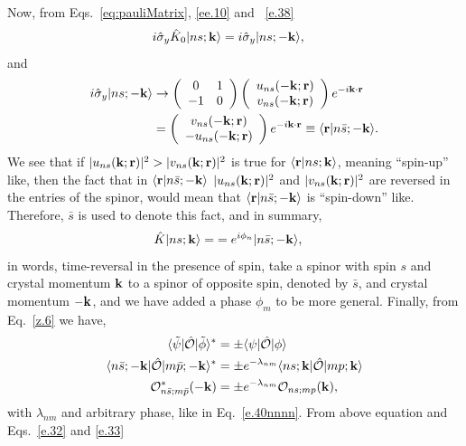 \documentclass[floatfix,prb,aps,superscriptaddress,11pt]{revtex4}
\begin{document}
Now, from 
Eqs.~\eqref{eq:pauliMatrix}, \eqref{ee.10} 
and ~\eqref{e.38}
\begin{align}\label{e.40}
i\hat{\sigma}_y\hat K_0
| ns;\mathbf{k} \rangle
&=
i\hat{\sigma}_y| ns;-\mathbf{k} \rangle
,
\end{align}  
and
\begin{eqnarray}\label{e.38nnn}
i\hat{\sigma}_y| ns;-\mathbf{k} \rangle
&\to  
\left(\begin{array}{cc}   
0  & 1 \\   
-1 & 0  
\end{array}\right)  
\left(\begin{array}{c}   
u_{n s}(-\mathbf{k};\mathbf{r})  \\   
v_{n s}(-\mathbf{k};\mathbf{r})  
\end{array}\right)    
e^{-i\mathbf{k}\cdot\mathbf{r}}
\nonumber\\
&=
\left(\begin{array}{c} 
v_{ns}(-\mathbf{k};\mathbf{r})  \\ 
-u_{ns}(-\mathbf{k};\mathbf{r})  
\end{array}\right)   
e^{-i\mathbf{k}\cdot\mathbf{r}}
\equiv \langle {\mathbf{r}} | {n\bar s;-\mathbf{k}} \rangle
.  
\end{eqnarray}  
We see that if 
$|u_{ns}(\mathbf{k};\mathbf{r})|^2>|v_{ns}(\mathbf{k};\mathbf{r})|^2$  
is true for 
$\langle {\mathbf{r}} | {ns;\mathbf{k}} \rangle$, 
meaning ``spin-up'' like, 
then the fact that in
$\langle {\mathbf{r}} | {n\bar s;-\mathbf{k}} \rangle$ 
$|u_{ns}(\mathbf{k};\mathbf{r})|^2$ and $|v_{ns}(\mathbf{k};\mathbf{r})|^2$ are reversed in
the entries of the spinor, would mean that  
$\langle {\mathbf{r}} | {n\bar s;-\mathbf{k}} \rangle$ 
is ``spin-down'' like. Therefore, $\bar s$ is used to denote this
fact, and in summary, 
\begin{align}\label{e.40nnnn}
\hat K| ns;\mathbf{k} \rangle=
&
=e^{i\phi_n}| n\bar s;-\mathbf{k} \rangle
,
\end{align}
in words, time-reversal in the presence of spin, take a spinor with
spin $s$ and crystal momentum $\mathbf{k}$ to a spinor of opposite spin,
denoted by $\bar s$, and crystal momentum $-\mathbf{k}$, and we have added a
phase $\phi_m$ to be more general.
Finally, from Eq.~\eqref{z.6} we have,
\begin{align}\label{z.7}
\langle \tilde\psi |\hat{{\cal O}}| \tilde\phi \rangle^* 
&=
\pm\langle \psi |\hat{{\cal O}}| \phi \rangle
\nonumber\\
\langle n\bar s;-\mathbf{k} |\hat{{\cal O}}| m\bar p;-\mathbf{k} \rangle^* 
&=
\pm e^{-\lambda_{nm}}\langle ns;\mathbf{k} |\hat{{\cal O}}| mp;\mathbf{k} \rangle
\nonumber\\
{\cal O}^*_{n\bar s;m\bar p}(-\mathbf{k})
&=\pm e^{-\lambda_{nm}}
{\cal O}_{ns;mp}(\mathbf{k})
, 
\end{align}
with $\lambda_{nm}$ and arbitrary phase, like in
Eq.~\eqref{e.40nnnn}. From above equation and Eqs.~\eqref{e.32} and \eqref{e.33} 
\end{document}
